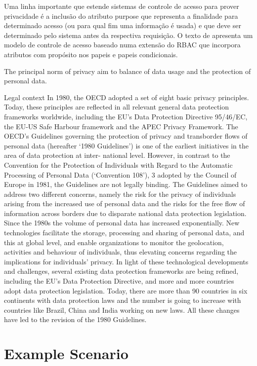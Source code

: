 \documentclass{doublecol-new}
\begin{document}
Uma linha importante que estende sistemas de controle de acesso para prover privacidade é a inclusão do atributo purpose que representa a finalidade para determinado acesso (ou para qual fim uma informação é usada) e que deve ser determinado pelo sistema antes da respectiva requisição. O texto de \cite{byun2005purpose} apresenta um modelo de controle de acesso baseado numa extensão do RBAC que incorpora atributos com propósito nos papeis e papeis condicionais.

The principal norm of privacy aim to balance of data usage and the protection of personal data.

\cite{kuschewsky2014new}
Legal context
In 1980, the OECD adopted a set of eight basic privacy principles. Today, these principles are reflected in all relevant general data protection frameworks worldwide, including the EU’s Data Protection Directive 95/46/EC, the EU-US Safe Harbour framework and the APEC Privacy Framework. The OECD’s Guidelines governing the protection of privacy and transborder flows of
personal data (hereafter ‘1980 Guidelines’) is one of the earliest initiatives in the area of data protection at inter-
national level. However, in contrast to the Convention for the Protection of Individuals with Regard to the Automatic Processing of Personal Data (‘Convention 108’), 3 adopted by the Council of Europe in 1981, the Guidelines are not legally binding. The Guidelines aimed to address two different concerns, namely the risk for the privacy of individuals arising from the increased use of personal data and the risks for the free flow of information across borders due to disparate national data protection legislation. Since the 1980s the volume of personal data has increased exponentially. New technologies facilitate the storage, processing and sharing of personal data, and this at global level, and enable organizations to monitor the geolocation, activities and behaviour of individuals, thus elevating concerns regarding the implications for individuals’ privacy. In light of these technological developments and challenges, several existing data protection frameworks are being refined, including the EU’s Data Protection Directive, and more and more countries adopt data protection legislation. Today, there are more than 90 countries in six continents with data protection laws and the number is going to increase with countries like Brazil, China and India working on new laws. All these changes have led to the revision of the 1980 Guidelines.


\section{Example Scenario}
\end{document}
